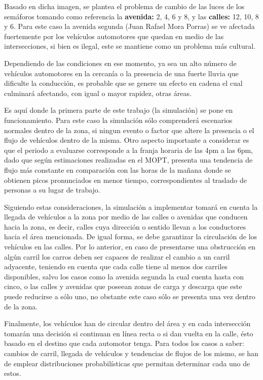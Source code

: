 \documentclass[conference]{IEEEtran}
\begin{document}
		Basado en dicha imagen, se plantea el problema de cambio de las luces de los
	sem\'{a}foros tomando como referencia la \textbf{avenida:} 2, 4, 6 y 8,  y las
	\textbf{calles:}
	12, 10, 8 y 6. Para este caso la avenida segunda (Juan Rafael Mora Porras) se ve afectada fuertemente por los veh\'{i}culos automotores que quedan en medio de las intersecciones, si bien es ilegal, este se mantiene como un problema m\'{a}s cultural.
			
	Dependiendo de las condiciones en ese momento, ya sea un alto n\'{u}mero de
	veh\'{i}culos automotores en la cercan\'{i}a o la presencia de una fuerte lluvia que
	dificulte la conducci\'{o}n, es probable que se genere un efecto en cadena el cual
	culminar\'{a} afectando, con igual o mayor rapidez, otras \'{a}reas.

	Es aqu\'{i} donde la primera parte de este trabajo (la simulaci\'{o}n) se pone en funcionamiento. Para este caso la simulaci\'{o}n s\'{o}lo comprender\'{a} escenarios normales dentro de la zona, si ningun evento o factor que altere la presencia o el flujo de veh\'{i}culos dentro de la misma. Otro aspecto importante a considerar es que el periodo a evaluarse corresponde a la franja horaria de las 4pm a las 6pm, dado que seg\'{u}n estimaciones realizadas en el MOPT, presenta una tendencia de flujo m\'{a}s constante en comparaci\'{o}n con las horas de la ma\~{n}ana donde se obtienen picos pronunciados en menor tiempo, correspondientes al traslado de personas a su lugar de trabajo.
	
	Siguiendo estas consideraciones, la simulaci\'{o}n a implementar tomar\'{a} en cuenta la llegada de veh\'{i}culos a la zona por medio de las calles o avenidas que conducen hacia la zona, es decir, calles cuya direcci\'{o}n o sentido llevan a los conductores hacia el \'{a}rea mencionada. De igual forma, se debe garantizar la circulaci\'{o}n de los veh\'{i}culos en las calles. Por lo anterior, en caso de presentarse una obstrucci\'{o}n en alg\'{u}n carril los carros deben ser capaces de realizar el cambio a un carril adyacente, teniendo en cuenta que cada calle tiene al menos dos carriles disponibles, salvo los casos como la avenida segunda la cual cuenta hasta con cinco, o las calles y avenidas que poseean zonas de carga y descarga que este puede reducirse a s\'{o}lo uno, no obstante este caso s\'{o}lo se presenta una vez dentro de la zona.

	Finalmente, los veh\'{i}culos han de circular dentro del \'{a}rea y en cada intersecci\'{o}n tomar\'{a}n una decisi\'{o}n si continuan en l\'{i}nea recta o si dan vuelta en la calle, \'{e}sto basado en el destino que cada automotor tenga. Para todos los casos a saber: cambios de carril, llegada de veh\'{i}culos y tendencias de flujos de los mismo, se han de emplear distribuciones probabil\'{i}sticas que permitan determinar cada uno de estos.
	
\end{document}
